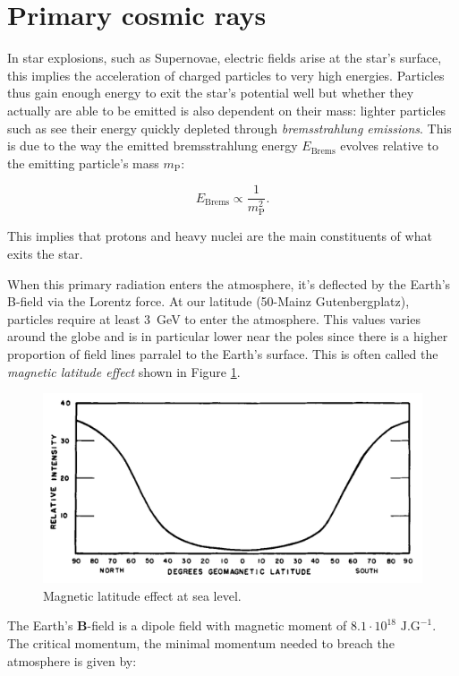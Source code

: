 \section{Primary cosmic rays}

In star explosions, such as Supernovae, electric fields arise at the star's surface, this implies the acceleration of charged particles to very high energies. Particles thus gain enough energy to exit the star's potential well but whether they actually are able to be emitted is also dependent on their mass: lighter particles such as \Pelectron see their energy quickly depleted through \textit{bremsstrahlung emissions}. This is due to the way the emitted bremsstrahlung energy $E_\text{Brems}$ evolves relative to the emitting particle's mass $m_\text{P}$:

\begin{equation}
E_\text{Brems}	\propto \frac{1}{m_\text{P}^2}.
\end{equation}

This implies that protons and heavy nuclei are the main constituents of what exits the star.

When this primary radiation enters the atmosphere, it's deflected by the Earth's B-field via the Lorentz force. At our latitude (50\degree -Mainz Gutenbergplatz), particles require at least \SI{3}{\giga\electronvolt} to enter the atmosphere. This values varies around the globe and is in particular lower near the poles since there is a higher proportion of field lines parralel to the Earth's surface. This is often called the \textit{magnetic latitude effect} shown in Figure \ref{fig:magintensity}.


\begin{figure}[htbp]
\centering
\includegraphics[width=0.8\linewidth]{./fig/intensity.png}
\caption{Magnetic latitude effect at sea level.}
\label{fig:magintensity}
\end{figure}

The Earth's $\mathbf{B}$-field is a dipole field with magnetic moment of $8.1 \cdot 10^{18}\text{ J}.\text{G}^{-1}$. The critical momentum, the minimal momentum needed to breach the atmosphere is given by:

